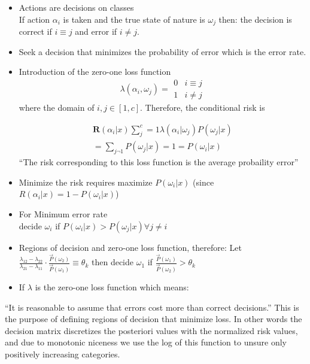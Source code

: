 \documentclass[11pt]{article}
\begin{document}
\begin{itemize}
	\item Actions are decisions on classes \\
	If action $\alpha_i$ is taken and the true state of nature is $\omega _j$ then: the decision is correct if $i\equiv j$ and error if $i \neq j$.
	\item Seek a decision that minimizes the probability of error which is the error rate.
	\item Introduction of the zero-one loss function
	\[ 
		\lambda (\alpha_i, \omega_j) = 
		\begin{array} {ll}
			0 & i \equiv j \\
			1 & i \neq j 
		\end{array}	
	\]
	where the domain of $i,j \in [1,c]$.  Therefore, the conditional risk is 
	

	\begin{eqnarray*}
	\mathbf{R}(\alpha_i | x) \sum ^{c} _j=1 \lambda (\alpha_i | \omega_j) P(\omega_j | x) \\
	= \sum _{j \neg 1} P(\omega _j | x) = 1 = P(\omega_i | x) 	
	\end{eqnarray*}
	``The risk corresponding to this loss function is the average probaility error''
	\item Minimize the risk requires maximize $P(\omega_i | x)$ (since $R(\alpha_i | x) = 1 - P(\omega_i | x)$)
	\item For Minimum error rate \\
	decide $\omega_i$ if $P(\omega_i | x) > P(\omega_j | x) \forall j \neq i$
	\item Regions of decision and zero-one loss function, therefore: 
	Let $\frac{\lambda_{12} - \lambda_{22}}{\lambda_{21} - \lambda_{11}} \cdot \frac{\vec{P}(\omega_2)}{\vec{P}(\omega_1)} \equiv \theta_k$ then decide $\omega_1$ if $\frac{\vec{P}(\omega_1)}{\vec{P}(\omega_2)} > \theta_k$
	\item If $\lambda$ is the zero-one loss function which means:
	
\end{itemize}

``It is reasonable to assume that errors cost more than correct decisions.''\cite{nadler}  This is the purpose of defining regions of decision that minimize loss. In other words the decision matrix discretizes the posteriori values with the normalized risk values, and due to monotonic niceness we use the log of this function to unsure only positively increasing categories.  
\end{document}
